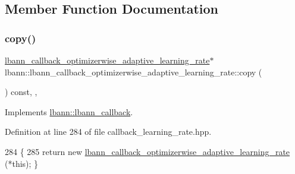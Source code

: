 \subsection{Member Function Documentation}
\mbox{\label{classlbann_1_1lbann__callback__optimizerwise__adaptive__learning__rate_aa28bce451c8f1fa3b273218be976b923}} 
\subsubsection{\texorpdfstring{copy()}{copy()}}
{\footnotesize\ttfamily \hyperlink{classlbann_1_1lbann__callback__optimizerwise__adaptive__learning__rate}{lbann\+\_\+callback\+\_\+optimizerwise\+\_\+adaptive\+\_\+learning\+\_\+rate}$\ast$ lbann\+::lbann\+\_\+callback\+\_\+optimizerwise\+\_\+adaptive\+\_\+learning\+\_\+rate\+::copy (\begin{DoxyParamCaption}{ }\end{DoxyParamCaption}) const\hspace{0.3cm}{\ttfamily [inline]}, {\ttfamily [override]}, {\ttfamily [virtual]}}



Implements \hyperlink{classlbann_1_1lbann__callback_a9f545d1269a8c7af335625d049691f26}{lbann\+::lbann\+\_\+callback}.



Definition at line 284 of file callback\+\_\+learning\+\_\+rate.\+hpp.


\begin{DoxyCode}
284                                                                              \{
285     \textcolor{keywordflow}{return} \textcolor{keyword}{new} \hyperlink{classlbann_1_1lbann__callback__optimizerwise__adaptive__learning__rate_a4ab8768ad85fe17728d62eceb628cc9f}{lbann\_callback\_optimizerwise\_adaptive\_learning\_rate}
      (*\textcolor{keyword}{this}); \}
\end{DoxyCode}
\mbox{\label{classlbann_1_1lbann__callback__optimizerwise__adaptive__learning__rate_a31120725bd22d1ce783a6edba9c5fb5d}} 
